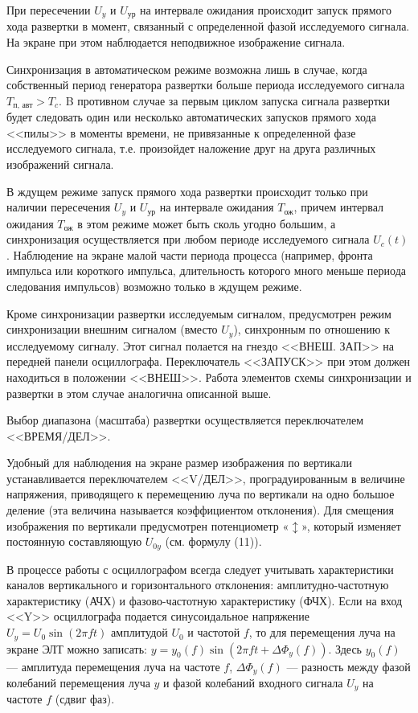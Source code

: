 \documentclass[14pt]{article}
\begin{document}
При пересечении $U_y$ и $U_{\text{ур}}$ на интервале ожидания происходит запуск прямого хода развертки в момент, связанный с определенной фазой исследуемого сигнала. На экране при этом наблюдается неподвижное изображение сигнала.

Синхронизация в автоматическом режиме возможна лишь в случае, когда собственный период генератора развертки больше периода исследуемого сигнала $T_{\text{п, авт}}>T_c$. B противном случае за первым циклом запуска сигнала развертки будет следовать один или несколько автоматических запусков прямого хода <<пилы>> в моменты времени, не привязанные к определенной фазе исследуемого сигнала, т.е. произойдет наложение друг на друга различных изображений сигнала.

В ждущем режиме запуск прямого хода развертки происходит только при наличии пересечения $U_y$ и $U_{\text{ур}}$ на интервале ожидания $T_{\text{ож}}$, причем интервал ожидания $T_{\text{ож}}$ в этом режиме может быть сколь угодно большим, а синхронизация осуществляется при любом периоде исследуемого сигнала $U_c(t)$. Наблюдение на экране малой части периода процесса (например, фронта импульса или короткого импульса, длительность которого много меньше периода следования импульсов) возможно только в ждущем режиме.

Кроме синхронизации развертки исследуемым сигналом, предусмотрен режим синхронизации внешним сигналом (вместо $U_y$), синхронным по отношению к исследуемому сигналу. Этот сигнал полается на гнездо <<ВНЕШ. ЗАП>> на передней панели осциллографа. Переключатель <<ЗАПУСК>> при этом должен находиться в положении <<ВНЕШ>>. Работа элементов схемы синхронизации и развертки в этом случае аналогична описанной выше.

Выбор диапазона (масштаба) развертки осуществляется переключателем <<ВРЕМЯ/ДЕЛ>>.

Удобный для наблюдения на экране размер изображения по вертикали устанавливается переключателем <<V/ДЕЛ>>, проградуированным в величине напряжения, приводящего к перемещению луча по вертикали на одно большое деление (эта величина называется коэффициентом отклонения). Для смещения изображения по вертикали предусмотрен потенциометр «$\updownarrow$», который изменяет постоянную составляющую $U_{0y}$ (см. формулу (11)).

В процессе работы с осциллографом всегда следует учитывать характеристики каналов вертикального и горизонтального отклонения: амплитудно-частотную характеристику (АЧХ) и фазово-частотную характеристику (ФЧХ). Если на вход <<Y>> осциллографа подается синусоидальное напряжение $U_y = U_0\sin (2\pi ft)$ амплитудой $U_0$ и частотой $f$, то для перемещения луча на экране ЭЛТ можно записать: $y = y_0(f)\sin (2\pi ft + \Delta \Phi_y(f))$. Здесь $y_0(f)$ --- амплитуда перемещения луча на частоте $f$, $\Delta \Phi_y(f)$ --- разность между фазой колебаний перемещения луча $y$ и фазой колебаний входного сигнала $U_y$ на частоте $f$ (сдвиг фаз).
\end{document}
